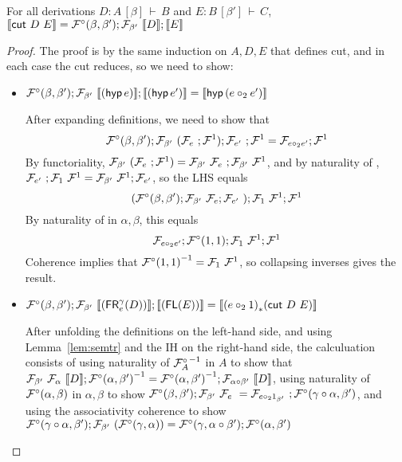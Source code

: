 \documentclass{drl-common/llncs}
\renewcommand{\sem}[1]{\ensuremath{ \llbracket #1 \rrbracket}}
\newcommand{\inv}[1]{\ensuremath{{#1}^{-1}}}
\newcommand\compo[2]{\ensuremath{#1 \circ #2}}
\newcommand\comph[2]{\ensuremath{#1 \mathbin{\circ_2} #2}}
\newcommand\seq[3]{\ensuremath{#1 \, [ #2 ] \, \vdash \, #3}}
\newcommand\tr[2]{\ensuremath{{{#1}_{*}(#2)}}}
\newcommand\cut[2]{\ensuremath{{\dsd{cut} \,\, #1 \,\, #2}}}
\newcommand\hyp[1]{\ensuremath{\dsd{hyp} \, {#1}}}
\newcommand\FR[3]{\ensuremath{\dsd{FR}^{#1}_{#2}(#3)}}
\newcommand\FL[1]{\ensuremath{\dsd{FL}(#1)}}
\begin{document}
\begin{lemma}
For all derivations $D : \seq{A}{\beta}{B}$ and $E : \seq{B}{\beta'}{C}$, $\sem{\cut D E} = {\semFcomp(\beta,\beta')};{\semF{\beta'}{\sem{D}}};{\sem{E}}$
\end{lemma}

\newcommand{\semofcut}[2]{{\semFcomp(\beta,\beta')};{\semF{\beta'}{\sem{#1}}};{\sem{#2}}}

\begin{proof}

The proof is by the same induction on $A,D,E$ that defines cut, and in
each case the cut reduces, so we need to show:

\begin{itemize}
\item $\semofcut {(\hyp e)} {(\hyp {e'})} = \sem{\hyp {(\comph{e}{e'})}}$

After expanding definitions, we need to show that
\[
\semFcomp(\beta,\beta');\semF{\beta'}{(\semF{e};\semFone)};\semF{e'};\semFone = \semFo{\comph{e}{e'}};\semFone
\]
By functoriality, $\mathcal{F}_{\beta'} \,\, (\mathcal{F}_{e} \,\, ;{\mathcal{F}^1}) =
\mathcal{F}_{\beta'} \,\, \mathcal{F}_{e} \,\, ;\mathcal{F}_{\beta'} \,\, {\mathcal{F}^1}$, and by naturality of
, $\mathcal{F}_{e'} \,\, ;{\mathcal{F}_{1} \,\, {\mathcal{F}^1}} =
\mathcal{F}_{\beta'} \,\, {\mathcal{F}^1};{\mathcal{F}_{e'}}$,
so the LHS equals
\[
(\mathcal{F}^\circ(\beta,\beta');\mathcal{F}_{\beta'} \,\, {\mathcal{F}_{e}};\mathcal{F}_{e'} \,\, );{\mathcal{F}_{1} \,\, {\mathcal{F}^1}};{\mathcal{F}^1}
\]
By naturality of \semFcomp in $\alpha,\beta$, this equals
\[
\semFo{\comph{e}{e'}};\semFcomp(1,1);{\semF{1}{\semFone}};\semFone
\]
Coherence implies that $\inv{\semFcomp(1,1)} = \semF{1}{\semFone}$, so
collapsing inverses gives the result.  

\item $\semofcut {(\FR \gamma e D)} {(\FL E)} = \sem{ \tr {(\comph{e}{1})} {\cut D E} }$

After unfolding the definitions on the left-hand side, and using
Lemma~\ref{lem:semtr} and the IH on the right-hand side, 
the calculuation consists of using naturality of $\inv{\semFcomp_A}$ in $A$ to
show that $\semF{\beta'}{\semF{\alpha}{\sem
    D}};\inv{\semFcomp(\alpha,\beta')} =
\inv{\semFcomp(\alpha,\beta')};\semF{\compo \alpha \beta'}{\sem{D}}$,
using naturality of $\mathcal{F}^\circ(\alpha,\beta)$ in $\alpha,\beta$ to
show 
$\semFcomp(\beta,\beta');\semF{\beta'}{\semF{e}} =
\semF{\comph{e}{1_{\beta'}}};\semFcomp(\compo{\gamma}{\alpha},\beta')$, 
and using the associativity coherence to show
$\semFcomp(\compo{\gamma}{\alpha},\beta');\semF{\beta'}{(\semFcomp(\gamma,\alpha))}
= \semFcomp(\gamma,\compo{\alpha}{\beta'});\semFcomp(\alpha,\beta')$


\end{itemize}
\end{proof}
\end{document}
